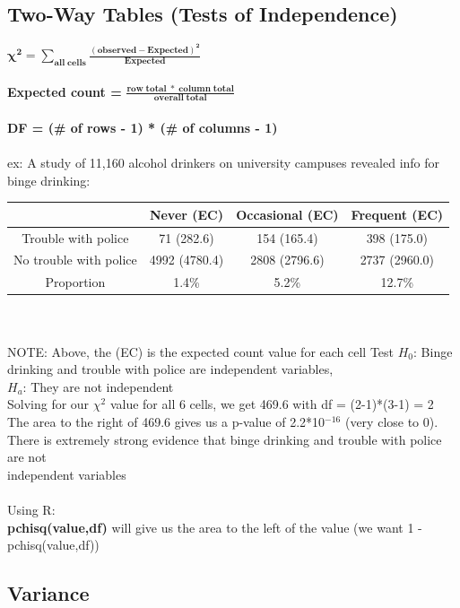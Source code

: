 \documentclass[12pt, a4paper]{article}
\begin{document}
	\subsection{Two-Way Tables (Tests of Independence)}
	$\bm{\chi^2 = \sum_{all\;cells} \frac{(observed - Expected)^2}{Expected}}$ \\~\\
	\textbf{Expected count =} $\bm{\frac{row\; total\; *\; column\; total}{overall\; total}}$ \\~\\
	\textbf{DF = (\# of rows - 1) * (\# of columns - 1)} \\~\\
	ex: A study of 11,160 alcohol drinkers on university campuses revealed info for binge drinking: 
	\begin{tabular}{ |c|c|c|c| }
		\hline
		 & Never (EC) & Occasional (EC) & Frequent (EC) \\ \hline
		Trouble with police & 71 (282.6) & 154 (165.4) & 398 (175.0) \\ \hline
		No trouble with police & 4992 (4780.4) & 2808 (2796.6) & 2737 (2960.0) \\ \hline
		Proportion & 1.4\% & 5.2\% & 12.7\% \\ \hline
	\end{tabular} \\~\\	
	NOTE: Above, the (EC) is the expected count value for each cell
	Test $H_0$: Binge drinking and trouble with police are independent variables, \\ $H_a$: They are not independent \\
	Solving for our $\chi^2$ value for all 6 cells, we get 469.6 with df = (2-1)*(3-1) = 2 \\
	The area to the right of 469.6 gives us a p-value of 2.2*10$^{-16}$ (very close to 0). \\
	There is extremely strong evidence that binge drinking and trouble with police are not \\ independent variables \\~\\
	Using R: \\
	\textbf{pchisq(value,df)} will give us the area to the left of the value (we want 1 - pchisq(value,df)) \newpage
	
\begin{center} \section{Variance} \end{center}
\end{document}
